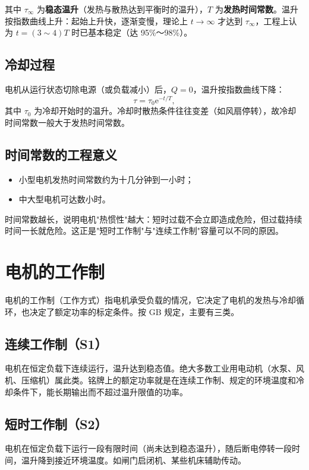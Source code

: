 
其中 $\tau_\infty$ 为\textbf{稳态温升}（发热与散热达到平衡时的温升），$T$ 为\textbf{发热时间常数}。温升按指数曲线上升：起始上升快，逐渐变慢，理论上 $t\to\infty$ 才达到 $\tau_\infty$，工程上认为 $t=(3\sim4)T$ 时已基本稳定（达 95\%～98\%）。

\subsection{冷却过程}
电机从运行状态切除电源（或负载减小）后，$Q=0$，温升按指数曲线下降：
\begin{equation}
\tau=\tau_0\mathrm{e}^{-t/T},
\end{equation}
其中 $\tau_0$ 为冷却开始时的温升。冷却时散热条件往往变差（如风扇停转），故冷却时间常数一般大于发热时间常数。

\subsection{时间常数的工程意义}
\begin{itemize}
  \item 小型电机发热时间常数约为十几分钟到一小时；
  \item 中大型电机可达数小时。
\end{itemize}
时间常数越长，说明电机"热惯性"越大：短时过载不会立即造成危险，但过载持续时间一长就危险。这正是"短时工作制"与"连续工作制"容量可以不同的原因。

\section{电机的工作制}

电机的工作制（工作方式）指电机承受负载的情况，它决定了电机的发热与冷却循环，也决定了额定功率的标定条件。按 GB 规定，主要有三类。

\subsection{连续工作制（S1）}
电机在恒定负载下连续运行，温升达到稳态值。绝大多数工业用电动机（水泵、风机、压缩机）属此类。铭牌上的额定功率就是在连续工作制、规定的环境温度和冷却条件下，能长期输出而不超过温升限值的功率。

\subsection{短时工作制（S2）}
电机在恒定负载下运行一段有限时间（尚未达到稳态温升），随后断电停转一段时间，温升降到接近环境温度。如闸门启闭机、某些机床辅助传动。

